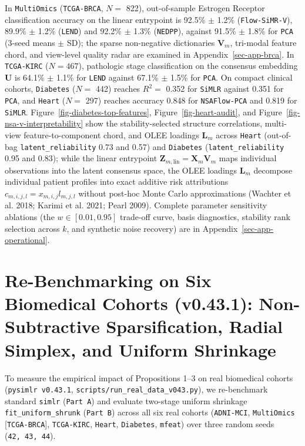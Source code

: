 \documentclass[
  10pt,
  letterpaper,
]{report}
\begin{document}
In \texttt{MultiOmics} (\texttt{TCGA-BRCA}, \(N =\) 822), out-of-sample
Estrogen Receptor classification accuracy on the linear entrypoint is
92.5\% \(\pm\) 1.2\% (\texttt{Flow-SiMR-V}), 89.9\% \(\pm\) 1.2\%
(\texttt{LEND}) and 92.2\% \(\pm\) 1.3\% (\texttt{NEDPP}), against
91.5\% \(\pm\) 1.8\% for \texttt{PCA} (3-seed means \(\pm\) SD); the
sparse non-negative dictionaries \(\mathbf{V}_m\), tri-modal feature
chord, and view-level quality radar are examined in
Appendix~\ref{sec-app-brca}. In \texttt{TCGA-KIRC} (\(N = 467\)),
pathologic stage classification on the consensus embedding
\(\mathbf{U}\) is 64.1\% \(\pm\) 1.1\% for \texttt{LEND} against 67.1\%
\(\pm\) 1.5\% for \texttt{PCA}. On compact clinical cohorts,
\texttt{Diabetes} (\(N =\) 442) reaches \(R^2 =\) 0.352 for
\texttt{SiMLR} against 0.351 for \texttt{PCA}, and \texttt{Heart}
(\(N =\) 297) reaches accuracy 0.848 for \texttt{NSAFlow-PCA} and 0.819
for \texttt{SiMLR}. Figure~\ref{fig-diabetes-top-features},
Figure~\ref{fig-heart-audit}, and
Figure~\ref{fig-nsa-v-interpretability} show the stability-selected
structure correlations, multi-view feature-to-component chord, and OLEE
loadings \(\mathbf{L}_m\) across \texttt{Heart} (out-of-bag
\texttt{latent\_reliability} 0.73 and 0.57) and \texttt{Diabetes}
(\texttt{latent\_reliability} 0.95 and 0.83); while the linear
entrypoint \(\mathbf{Z}_{m,\text{lin}} = \mathbf{X}_m \mathbf{V}_m\)
maps individual observations into the latent consensus space, the OLEE
loadings \(\mathbf{L}_m\) decompose individual patient profiles into
exact additive risk attributions \(c_{m,i,j,l} = x_{m,i,j} l_{m,j,l}\)
without post-hoc Monte Carlo approximations (Wachter et al. 2018; Karimi
et al. 2021; Pearl 2009). Complete parameter sensitivity ablations (the
\(w \in [0.01, 0.95]\) trade-off curve, basis diagnostics, stability
rank selection across \(k\), and synthetic noise recovery) are in
Appendix~\ref{sec-app-operational}.

\section{Re-Benchmarking on Six Biomedical Cohorts (v0.43.1):
Non-Subtractive Sparsification, Radial Simplex, and Uniform
Shrinkage}\label{sec-exp-v043-revisit}

To measure the empirical impact of Propositions 1--3 on real biomedical
cohorts (\texttt{pysimlr\ v0.43.1},
\texttt{scripts/run\_real\_data\_v043.py}), we re-benchmark standard
\texttt{simlr} (\texttt{Part\ A}) and evaluate two-stage uniform
shrinkage \texttt{fit\_uniform\_shrunk} (\texttt{Part\ B}) across all
six real cohorts (\texttt{ADNI-MCI}, \texttt{MultiOmics}
{[}\texttt{TCGA-BRCA}{]}, \texttt{TCGA-KIRC}, \texttt{Heart},
\texttt{Diabetes}, \texttt{mfeat}) over three random seeds
(\texttt{42,\ 43,\ 44}).
\end{document}
